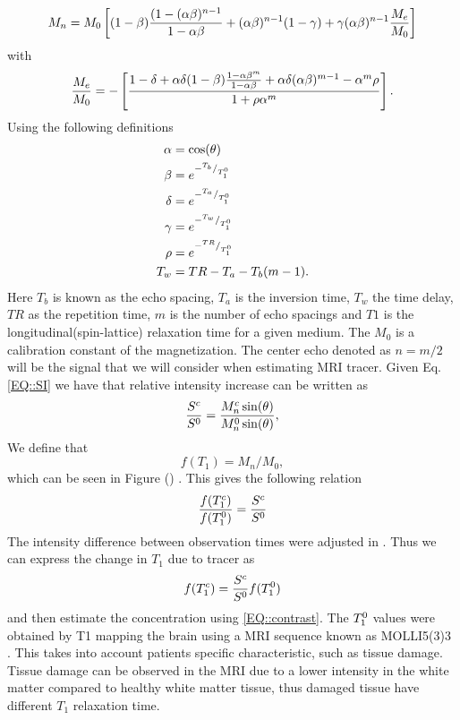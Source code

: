 \documentclass[11pt,a4paper]{article}
\begin{document}
\begin{equation}
M_{n} = M_{0}  \left[ (1-\beta)\frac{(1-(\alpha \beta)\sp{n-1} }{1-\alpha\beta} + (\alpha \beta)\sp{n-1}(1-\gamma) + \gamma ( \alpha \beta)\sp{n-1} \frac{M_{e}}{M_{0}}  \right]   
\end{equation}
with 
\begin{equation}
\frac{M_{e}}{M_{0}} = - \left[ \frac{ 1 -\delta + \alpha \delta (1-\beta ) \frac{1-\alpha\beta\sp{m}}{1-\alpha \beta} + \alpha\delta(\alpha\beta)\sp{m-1} - \alpha\sp{m}\rho}{1 +\rho \alpha\sp{m} } \right].
\end{equation}
Using the following definitions
\begin{equation}
\begin{aligned}
\alpha &= \cos ( \theta ) \\
\beta  &= e\sp{- \sp{T_b}/_{T_1\sp{0}} } \\
\delta &= e\sp{- \sp{T_a}/_{T_1\sp{0}} } \\
\gamma &= e\sp{- \sp{T_w}/_{T_1\sp{0}} } \\
\rho   &= e\sp{- \sp{TR}/_{T_1\sp{0}}}  \\
T_w    &= TR - T_a -T_b(m-1)       .\\
\end{aligned}
\end{equation}
Here $T_b$ is known as the echo spacing, $T_a$ is the inversion time, $T_w$ the time delay, $TR$ as the repetition time, $m$ is the number of echo spacings and $T1$ is the longitudinal(spin-lattice) relaxation time for a given medium. The $M_0$ is a calibration constant of the magnetization. The center echo denoted as $n=m/2$ will be the signal that we will consider when estimating MRI tracer. Given Eq.\ref{EQ::SI} we have that relative intensity increase can be written as 
\begin{equation}
\frac{S\sp{c}}{S\sp{0}} = \frac{ M_{n}\sp{c} \sin (\theta)}{ M_{n}\sp{0} \sin (\theta) } ,
\end{equation}
We define that  
\begin{equation}
f(T_1) = M_{n}/M_{0} ,
\label{scaledmagnetization}
\end{equation}
which can be seen in Figure () . 
This gives the following relation 
\begin{equation}
\frac{f(T_{1}\sp{c} ) }{f(T_{1}\sp{0})}  = \frac{S\sp{c}}{S\sp{0}} 
\end{equation}
The intensity difference between observation times were adjusted in \cite{eidevalnes}. Thus we can express the change in $T_1$ due to tracer as 
\begin{equation}
f ( T_{1}\sp{c} ) = \frac{S\sp{c}}{S\sp{0}} f(T_{1}\sp{0}) 
\end{equation}
and then estimate the concentration using \eqref{EQ::contrast}. The $T_{1}\sp{0}$ values were obtained by T1 mapping the brain using a MRI sequence known as MOLLI5(3)3 \cite{TAYLOR201667}. This takes into account patients specific characteristic, such as tissue damage. Tissue damage can be observed in the MRI due to a lower intensity in the white matter compared to healthy white matter tissue, thus damaged tissue have different $T_1$ relaxation time. 
\end{document}
